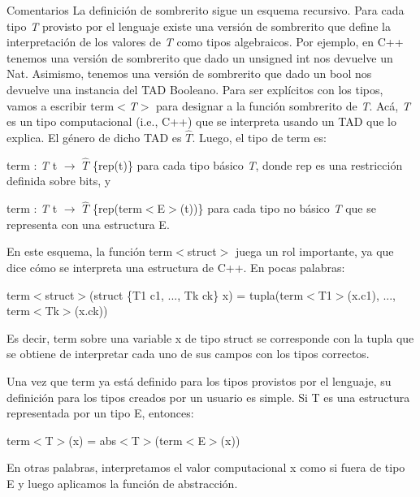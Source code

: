 \begin{DoxyRemark}{Comentarios}
La definición de sombrerito sigue un esquema recursivo. Para cada tipo {\itshape T} provisto por el lenguaje existe una versión de sombrerito que define la interpretación de los valores de {\itshape T} como tipos algebraicos. Por ejemplo, en C++ tenemos una versión de sombrerito que dado un unsigned int nos devuelve un Nat. Asimismo, tenemos una versión de sombrerito que dado un bool nos devuelve una instancia del T\+AD Booleano. Para ser explícitos con los tipos, vamos a escribir term$<${\itshape T$>$} para designar a la función sombrerito de {\itshape T}. Acá, {\itshape T} es un tipo computacional (i.\+e., C++) que se interpreta usando un T\+AD que lo explica. El género de dicho T\+AD es $\widehat{T}$. Luego, el tipo de term es\+:
\begin{DoxyEnumerate}
\item term \+: {\itshape T} t $\to$ $\widehat{T}$ \{rep(t)\} para cada tipo básico {\itshape T}, donde rep es una restricción definida sobre bits, y
\item term \+: {\itshape T} t $\to$ $\widehat{T}$ \{rep(term$<$\+E$>$(t))\} para cada tipo no básico {\itshape T} que se representa con una estructura E.
\end{DoxyEnumerate}

En este esquema, la función term$<$struct$>$ juega un rol importante, ya que dice cómo se interpreta una estructura de C++. En pocas palabras\+:
\begin{DoxyItemize}
\item term$<$struct$>$(struct \{T1 c1, ..., Tk ck\} x) = tupla(term$<$\+T1$>$(x.\+c1), ..., term$<$\+Tk$>$(x.\+ck))
\end{DoxyItemize}

Es decir, term sobre una variable x de tipo struct se corresponde con la tupla que se obtiene de interpretar cada uno de sus campos con los tipos correctos.

Una vez que term ya está definido para los tipos provistos por el lenguaje, su definición para los tipos creados por un usuario es simple. Si T es una estructura representada por un tipo E, entonces\+:
\begin{DoxyItemize}
\item term$<$\+T$>$(x) = abs$<$\+T$>$(term$<$\+E$>$(x))
\end{DoxyItemize}

En otras palabras, interpretamos el valor computacional x como si fuera de tipo E y luego aplicamos la función de abstracción. 
\end{DoxyRemark}


